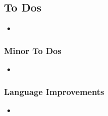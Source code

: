 

%
%

\setcounter{tocdepth}{1}
\listoftodos


\subsection*{To Dos}

\begin{itemize}
	\item ~
	
	

\end{itemize}


\subsubsection*{Minor To Dos}

\begin{itemize}
	\item ~
	

\end{itemize}


\subsubsection*{Language Improvements}

\begin{itemize}

	\item ~
	
\end{itemize}